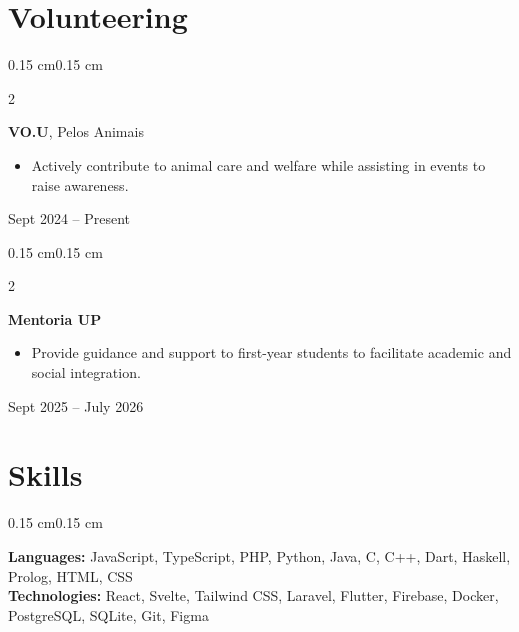 \documentclass[10pt, letterpaper]{article}
\newenvironment{highlights}{
    \begin{itemize}[
        topsep=0.06 cm, 
        parsep=0.06 cm, 
        partopsep=0pt,
        itemsep=0pt,
        leftmargin=0.3 cm + 8pt 
    ]
}{
    \end{itemize}
}
\newenvironment{onecolentry}{
    \begin{adjustwidth}{0.15 cm}{0.15 cm}
}{
    \end{adjustwidth}
}
\newenvironment{twocolentry}[2][]{
    \onecolentry
    \def\secondColumn{#2}
    \setcolumnwidth{\fill, 3.8 cm} 
    \begin{paracol}{2}
}{
    \switchcolumn \raggedleft \secondColumn
    \end{paracol}
    \endonecolentry
}
\begin{document}
    \section{Volunteering}
        \begin{twocolentry}{Sept 2024 – Present}
            \textbf{VO.U}, Pelos Animais
            \begin{highlights}
                \item Actively contribute to animal care and welfare while assisting in events to raise awareness.
            \end{highlights}
        \end{twocolentry}

        \vspace{0.1 cm}

        \begin{twocolentry}{Sept 2025 – July 2026}
            \textbf{Mentoria UP}
            \begin{highlights}
                \item Provide guidance and support to first-year students to facilitate academic and social integration.
            \end{highlights}
        \end{twocolentry}

    \section{Skills}
        \begin{onecolentry}
            \textbf{Languages:} JavaScript, TypeScript, PHP, Python, Java, C, C++, Dart, Haskell, Prolog, HTML, CSS \\
            \textbf{Technologies:} React, Svelte, Tailwind CSS, Laravel, Flutter, Firebase, Docker, PostgreSQL, SQLite, Git, Figma
        \end{onecolentry}
\end{document}
